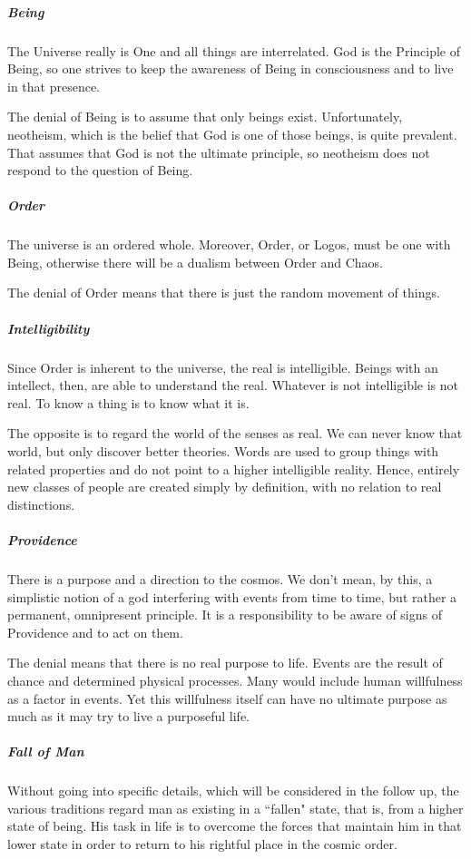 \subparagraph{Being}
The Universe really is One and all things are interrelated. God is the Principle of Being, so one strives to keep the awareness of Being in consciousness and to live in that presence.

The denial of Being is to assume that only beings exist. Unfortunately, neotheism, which is the belief that God is one of those beings, is quite prevalent. That assumes that God is not the ultimate principle, so neotheism does not respond to the question of Being.

\subparagraph{Order}
The universe is an ordered whole. Moreover, Order, or Logos, must be one with Being, otherwise there will be a dualism between Order and Chaos.

The denial of Order means that there is just the random movement of things.

\subparagraph{Intelligibility}
Since Order is inherent to the universe, the real is intelligible. Beings with an intellect, then, are able to understand the real. Whatever is not intelligible is not real. To know a thing is to know what it is.

The opposite is to regard the world of the senses as real. We can never know that world, but only discover better theories. Words are used to group things with related properties and do not point to a higher intelligible reality. Hence, entirely new classes of people are created simply by definition, with no relation to real distinctions.

\subparagraph{Providence}
There is a purpose and a direction to the cosmos. We don't mean, by this, a simplistic notion of a god interfering with events from time to time, but rather a permanent, omnipresent principle. It is a responsibility to be aware of signs of Providence and to act on them.

The denial means that there is no real purpose to life. Events are the result of chance and determined physical processes. Many would include human willfulness as a factor in events. Yet this willfulness itself can have no ultimate purpose as much as it may try to live a purposeful life.

\subparagraph{Fall of Man}
Without going into specific details, which will be considered in the follow up, the various traditions regard man as existing in a ``fallen" state, that is, from a higher state of being. His task in life is to overcome the forces that maintain him in that lower state in order to return to his rightful place in the cosmic order.

